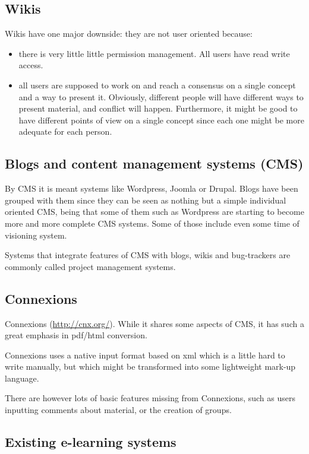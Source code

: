 \documentclass[12pt]{article}
\begin{document}
\subsection{Wikis}

Wikis have one major downside: they are not user oriented because:

\begin{itemize}
  \item there is very little little permission management. All users have read write access.
  \item all users are supposed to work on and reach a consensus on a single concept and a way to present it. Obviously, different people will have different ways to present material, and conflict will happen. Furthermore, it might be good to have different points of view on a single concept since each one might be more adequate for each person.
\end{itemize}

\subsection{Blogs and content management systems (CMS)}

By CMS it is meant systems like Wordpress, Joomla or Drupal. Blogs have been grouped with them since they can be seen as nothing but a simple individual oriented CMS, being that some of them such as Wordpress are starting to become more and more complete CMS systems. Some of those include even some time of visioning system.

Systems that integrate features of CMS with blogs, wikis and bug-trackers are commonly called project management systems.

\subsection{Connexions}

Connexions (\href{http://cnx.org/}{http://cnx.org/}). While it shares some aspects of CMS, it has such a great emphasis in pdf/html conversion.

Connexions uses a native input format based on xml which is a little hard to write manually, but which might be transformed into some lightweight mark-up language.

There are however lots of basic features missing from Connexions, such as users inputting comments about material, or the creation of groups.

\subsection{Existing e-learning systems} \label{sec-learning-websites}
\end{document}

